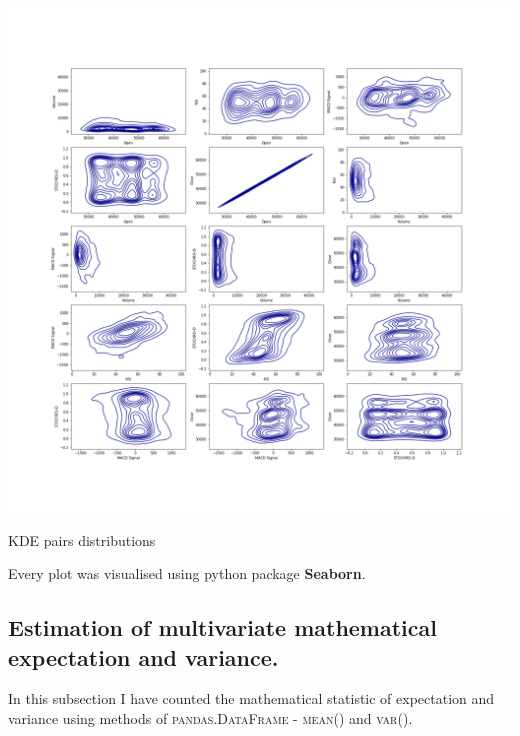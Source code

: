\documentclass[%
12pt, %
final, %
oneside, %
onecolumn, %
centertags]{article} %
\theoremstyle{plain}
\theoremstyle{definition}
\theoremstyle{remark}
\begin{document}
\begin{center}
\includegraphics[scale=0.37]{images/kde_pairs.png}

KDE pairs distributions
\end{center}

Every plot was visualised using python package \textbf{Seaborn}.

\subsection{Estimation of multivariate mathematical expectation and variance.}

In this subsection I have counted the mathematical statistic of expectation and variance using methods of \textsc{pandas.DataFrame} - \textsc{mean()} and \textsc{var()}.
\end{document}

